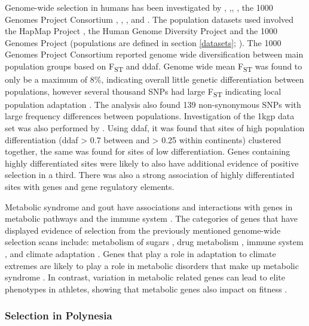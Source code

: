 \documentclass[]{report}
\begin{document}
Genome-wide selection in humans has been investigated by
\citet{sabeti2006positive},
\citet{pickrell2009signals},\citet{voight2006map}, \citet{Hancock2008},
the 1000 Genomes Project Consortium
\citep{1KGP2010, 1KGP2012, 1KGP2015snp}, \citet{Grossman2010},
\citet{Colonna2014}, and \citet{Mallick2016}. The population datasets
used involved the HapMap Project \citep{Hapmap2005}, the Human Genome
Diversity Project \citep{Cann2002, Rosenburg2002} and the 1000 Genomes
Project (populations are defined in section \ref{datasets};
\citet{1KGP2010}). The 1000 Genomes Project Consortium
\citep{1KGP2010, 1KGP2012, 1KGP2015snp} reported genome wide
diversification between main population groups based on
F\textsubscript{ST} and \gls{ddaf}. Genome wide mean F\textsubscript{ST}
was found to only be a maximum of 8\%, indicating overall little genetic
differentiation between populations, however several thousand SNPs had
large F\textsubscript{ST} indicating local population adaptation
\citep{1KGP2010}. The analysis also found 139 non-synonymous SNPs with
large frequency differences between populations. Investigation of the
\gls{1kgp} data set was also performed by \citet{Colonna2014}. Using
\gls{ddaf}, it was found that sites of high population differentiation
(\gls{ddaf} \textgreater{} 0.7 between and \textgreater{} 0.25 within
continents) clustered together, the same was found for sites of low
differentiation. Genes containing highly differentiated sites were
likely to also have additional evidence of positive selection in a
third. There was also a strong association of highly differentiated
sites with genes and gene regulatory elements.

Metabolic syndrome and gout have associations and interactions with
genes in metabolic pathways and the immune system \citep{Osborn2012}.
The categories of genes that have displayed evidence of selection from
the previously mentioned genome-wide selection scans include: metabolism
of sugars \citep{tang2007new, voight2006map}, drug metabolism
\citep{tang2007new}, immune system \citep{Grossman2010, tang2007new},
and climate adaptation \citep{Hancock2008}. Genes that play a role in
adaptation to climate extremes are likely to play a role in metabolic
disorders that make up metabolic syndrome \citep{Hancock2008}. In
contrast, variation in metabolic related genes can lead to elite
phenotypes in athletes, showing that metabolic genes also impact on
fitness \citep{Ahmetov2009a}.

\subsubsection{Selection in Polynesia}\label{selection-in-polynesia}
\end{document}
